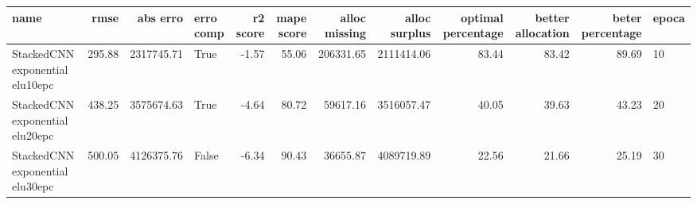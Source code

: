 \begin{tabular}{lrrlrrrrrrrl}
\toprule
name & rmse & abs erro & erro comp & r2 score & mape score & alloc missing & alloc surplus & optimal percentage & better allocation & beter percentage & epoca \\
\midrule
StackedCNN exponential elu10epc & 295.88 & 2317745.71 & True & -1.57 & 55.06 & 206331.65 & 2111414.06 & 83.44 & 83.42 & 89.69 & 10 \\
StackedCNN exponential elu20epc & 438.25 & 3575674.63 & True & -4.64 & 80.72 & 59617.16 & 3516057.47 & 40.05 & 39.63 & 43.23 & 20 \\
StackedCNN exponential elu30epc & 500.05 & 4126375.76 & False & -6.34 & 90.43 & 36655.87 & 4089719.89 & 22.56 & 21.66 & 25.19 & 30 \\
\bottomrule
\end{tabular}
